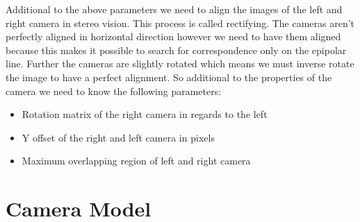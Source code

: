 \documentclass[11pt,a4paper,titlepage,oneside]{report}
\begin{document}
Additional to the above parameters we need to align the images of the left and right camera in stereo vision. This process is called rectifying. The cameras aren't perfectly aligned in horizontal direction however we need to have them aligned because this makes it possible to search for correspondence only on the epipolar line. Further the cameras are slightly rotated which means we must inverse rotate the image to have a perfect alignment. So additional to the properties of the camera we need to know the following parameters:
\begin{itemize}
	\item Rotation matrix of the right camera in regards to the left
	\item Y offset of the right and left camera in pixels
	\item Maximum overlapping region of left and right camera
\end{itemize}


\section{Camera Model}
\end{document}
